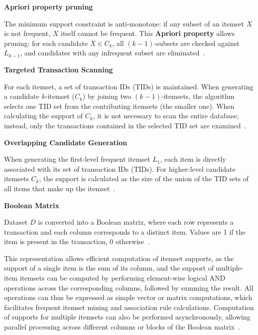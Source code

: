 \textbf{Apriori property pruning}

The minimum support constraint is anti-monotone: if any subset of an itemset $X$ is not frequent, $X$ itself cannot be frequent. This \textbf{Apriori property} allows pruning: for each candidate $X \in C_k$, all $(k-1)$-subsets are checked against $L_{k-1}$, and candidates with any infrequent subset are eliminated~\parencite{Han2012}.

\textbf{Targeted Transaction Scanning}

For each itemset, a set of transaction IDs (TIDs) is maintained. When generating a candidate $k$-itemset ($C_k$) by joining two $(k-1)$-itemsets, the algorithm selects one TID set from the contributing itemsets (the smaller one). When calculating the support of $C_k$, it is not necessary to scan the entire database; instead, only the transactions contained in the selected TID set are examined~\parencite{al2014improved}.

\textbf{Overlapping Candidate Generation}

When generating the first-level frequent itemset $L_1$, each item is directly associated with its set of transaction IDs (TIDs). For higher-level candidate itemsets $C_k$, the support is calculated as the size of the union of the TID sets of all items that make up the itemset~\parencite{yuan2017improved}.

\textbf{Boolean Matrix}

Dataset $D$ is converted into a Boolean matrix, where each row represents a transaction and each column corresponds to a distinct item. Values are 1 if the item is present in the transaction, 0 otherwise~\parencite{Ameta_Bhatnagar_2025}.

This representation allows efficient computation of itemset supports, as the support of a single item is the sum of its column, and the support of multiple-item itemsets can be computed by performing element-wise logical AND operations across the corresponding columns, followed by summing the result. All operations can thus be expressed as simple vector or matrix computations, which facilitates frequent itemset mining and association rule calculations. Computation of supports for multiple itemsets can also be performed asynchronously, allowing parallel processing across different columns or blocks of the Boolean matrix~\parencite{YU20111827}.


